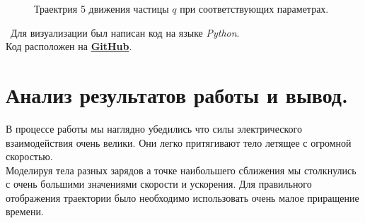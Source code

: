 \documentclass[a5paper, 10pt]{article}
\theoremstyle{definition}
\theoremstyle{plain}
\theoremstyle{remark}
\begin{document}
\begin{figure}[h!]
\caption{Траектрия 5 движения частицы $q$ при соответствующих параметрах.}
\end{figure}



\newpage

\newpage
\,
\newpage
Для визуализации был написан код на языке \textit{Python}. \\
Код расположен на \href{https://github.com/a-nechaeva/phys_project_2/blob/main/python_code/electric_move.py}{\textbf{GitHub}}.

\section{Анализ результатов работы и вывод.}
В процессе работы мы наглядно убедились что силы электрического взаимодействия очень велики. Они легко притягивают тело летящее с огромной скоростью.\\
Моделируя тела разных зарядов а точке наибольшего сближения мы столкнулись с очень большими значениями скорости и ускорения. Для правильного отображения траектории было необходимо использовать очень малое приращение времени.
\end{document}
